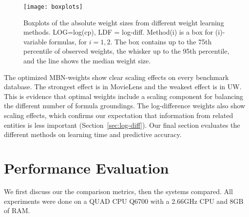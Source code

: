 \documentclass[twoside,leqno,twocolumn]{article}
\begin{document}
\begin{figure*}[htbp]
\begin{center}
\texttt{[image: boxplots]}
\caption{Boxplots of the absolute weight sizes from different weight learning methods. LOG=log(cp), LDF = log-diff. Method(i) is a box for (i)-variable formulas, for $i=1,2$. The box contains up to the 75th percentile of observed weights, the whisker up to the 95th percentile, and the line shows the median weight size.
\label{fig:boxplots}}
\end{center}
\end{figure*}

The optimized MBN-weights show clear scaling effects on every benchmark database. The strongest effect is in MovieLens and the weakest effect is in UW. This is evidence that optimal weights include a scaling component for balancing the different number of formula groundings. The log-difference weights also show scaling effects, which confirms our expectation that information from related entities is less important (Section~\ref{sec:log-diff}). 
Our final section evaluates the different methods on learning time and predictive accuracy.

\section{Performance Evaluation}

We first discuss our the comparison metrics, then the systems compared. All experiments were done on a QUAD CPU Q6700 with a 2.66GHz CPU and 8GB of RAM. 

\end{document}
